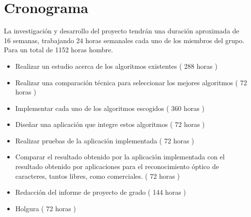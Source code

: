 \documentclass[a4paper, 11pt, oneside]{article}
\begin{document}
	\section{Cronograma}
	La investigación y desarrollo del proyecto tendrán una duración aproximada de 16 semanas,
	trabajando 24 horas semanales cada uno de los miembros del grupo. Para un total de 1152
	horas hombre.
	\begin{itemize}
	\item Realizar un estudio acerca de los algoritmos existentes ( 288 horas )
	\item Realizar una comparación técnica para seleccionar los mejores algoritmos ( 72 horas )
	\item Implementar cada uno de los algoritmos escogidos ( 360 horas )
	\item Diseñar una aplicación que integre estos algoritmos ( 72 horas )
	\item Realizar pruebas de la aplicación implementada ( 72 horas )
	\item Comparar el resultado obtenido por la aplicación implementada con el resultado obtenido por aplicaciones para el reconocimiento óptico de caracteres, tantos libres, como comerciales. ( 72 horas )
	\item Redacción del informe de proyecto de grado ( 144 horas )
	\item Holgura ( 72 horas )
	\end{itemize}
	\clearpage
	


\nocite{*}
\end{document}
